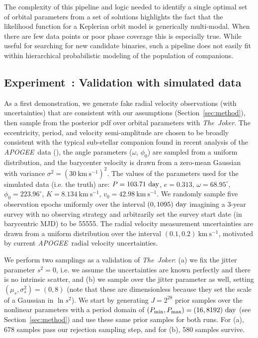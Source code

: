 \documentclass[manuscript, letterpaper]{aastex6}
\newcommand{\project}[1]{\textsl{#1}}
\newcommand{\acronym}[1]{{\small{#1}}}
\newcommand{\apogee}{\project{\acronym{APOGEE}}}
\newcommand{\samplername}{\project{The~Joker}}
\newcommand{\sectionname}{Section}
\newcommand{\kms}{\mathrm{km}~\mathrm{s}^{-1}}
\newcounter{expcounter}
\begin{document}
The complexity of this pipeline and logic needed to identify a single optimal
set of orbital parameters from a set of solutions highlights the fact that the
likelihood function for a Keplerian orbit model is generically multi-modal.
When there are few data points or poor phase coverage this is especially true.
While useful for searching for new candidate binaries, such a pipeline does not
easily fit within hierarchical probabilistic modeling of the population of
companions.

\subsection{Experiment~: Validation with simulated data}
\label{sec:validation}

As a first demonstration, we generate fake radial velocity observations (with
uncertainties) that are consistent with our assumptions
(\sectionname~\ref{sec:method}), then sample from the posterior pdf over orbital
parameters with \samplername.
The eccentricity, period, and velocity semi-amplitude are chosen to be broadly
consistent with the typical sub-stellar companion found in recent analysis of
the \apogee\ data (\citealt{Troup:2016}), the angle parameters ($\omega$,
$\phi_0$) are sampled from a uniform distribution, and the barycenter velocity
is drawn from a zero-mean Gaussian with variance $\sigma^2 = (30~\kms)^2$.
The values of the parameters used for the simulated data (i.e. the truth) are:
$P = 103.71~{\rm day}$, $e = 0.313$, $\omega = 68.95^\circ$,
$\phi_0 = 223.96^\circ$, $K = 8.134~\kms$, $v_0 = 42.98~\kms$.
We randomly sample five observation epochs uniformly over the interval $(0,1095)~{\rm day}$
imagining a 3-year survey with no observing strategy and arbitrarily set the
survey start date (in barycentric MJD) to be 55555.
The radial velocity measurement uncertainties are drawn from a uniform
distribution over the interval $(0.1, 0.2)~\kms$, motivated by current \apogee\
radial velocity uncertainties.

We perform two samplings as a validation of \samplername:
(a) we fix the jitter parameter $s^2 = 0$, i.e. we assume the uncertainties are
known perfectly and there is no intrinsic scatter, and (b) we sample over the
jitter parameter as well, setting $(\mu_s,\sigma^2_s) = (0,8)$ (note that these
are dimensionless because they set the scale of a Gaussian in $\ln s^2$).
We start by generating $J=2^{28}$ prior samples over the nonlinear parameters
with a period domain of $(P_{\rm min}, P_{\rm max}) = (16, 8192)~{\rm day}$ (see
\sectionname~\ref{sec:method}) and use these same prior samples for both runs.
For (a), 678 samples pass our rejection sampling step, and for (b), 580 samples
survive.
\end{document}
